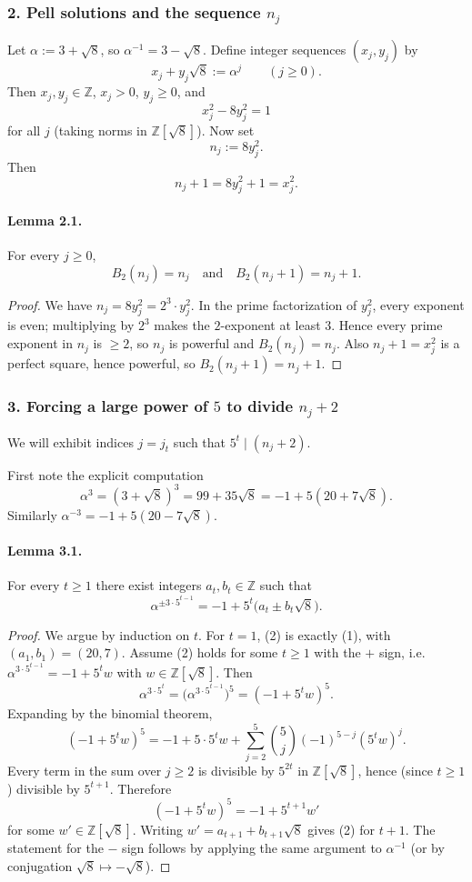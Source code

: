 \subsubsection*{2. Pell solutions and the sequence $n_j$}
Let $\alpha := 3+\sqrt{8}$, so $\alpha^{-1}=3-\sqrt{8}$.
Define integer sequences $(x_j,y_j)$ by
\[
 x_j + y_j\sqrt{8} := \alpha^j \qquad (j\ge 0).
\]
Then $x_j,y_j\in\mathbb{Z}$, $x_j>0$, $y_j\ge 0$, and
\[
 x_j^2 - 8y_j^2 = 1
\]
for all $j$ (taking norms in $\mathbb{Z}[\sqrt{8}]$).
Now set
\[
 n_j := 8y_j^2.
\]
Then
\[
 n_j+1 = 8y_j^2+1 = x_j^2.
\]

\paragraph{Lemma 2.1.} For every $j\ge 0$,
\[
B_2(n_j)=n_j\quad\text{and}\quad B_2(n_j+1)=n_j+1.
\]
\begin{proof}
We have $n_j=8y_j^2=2^3\cdot y_j^2$. In the prime factorization of $y_j^2$, every exponent is even; multiplying by $2^3$ makes the $2$-exponent at least $3$. Hence every prime exponent in $n_j$ is $\ge 2$, so $n_j$ is powerful and $B_2(n_j)=n_j$.
Also $n_j+1=x_j^2$ is a perfect square, hence powerful, so $B_2(n_j+1)=n_j+1$.
\end{proof}

\subsubsection*{3. Forcing a large power of $5$ to divide $n_j+2$}
We will exhibit indices $j=j_t$ such that $5^t\mid (n_{j}+2)$.

First note the explicit computation
\[
\alpha^3 = (3+\sqrt{8})^3 = 99 + 35\sqrt{8} = -1 + 5(20+7\sqrt{8}).
\tag{1}
\]
Similarly $\alpha^{-3}=-1+5(20-7\sqrt{8})$.

\paragraph{Lemma 3.1.} For every $t\ge 1$ there exist integers $a_t,b_t\in\mathbb{Z}$ such that
\[
\alpha^{\pm 3\cdot 5^{t-1}} = -1 + 5^t\bigl(a_t \pm b_t\sqrt{8}\bigr).
\tag{2}
\]
\begin{proof}
We argue by induction on $t$.
For $t=1$, (2) is exactly (1), with $(a_1,b_1)=(20,7)$.
Assume (2) holds for some $t\ge 1$ with the $+$ sign, i.e.
$\alpha^{3\cdot 5^{t-1}}=-1+5^t w$ with $w\in\mathbb{Z}[\sqrt{8}]$.
Then
\[
\alpha^{3\cdot 5^{t}} = \bigl(\alpha^{3\cdot 5^{t-1}}\bigr)^5 = (-1+5^t w)^5.
\]
Expanding by the binomial theorem,
\[
(-1+5^t w)^5 = -1 + 5\cdot 5^t w + \sum_{j=2}^5 \binom{5}{j} (-1)^{5-j} (5^t w)^j.
\]
Every term in the sum over $j\ge 2$ is divisible by $5^{2t}$ in $\mathbb{Z}[\sqrt{8}]$, hence (since $t\ge 1$) divisible by $5^{t+1}$. Therefore
\[
(-1+5^t w)^5 = -1 + 5^{t+1} w'
\]
for some $w'\in\mathbb{Z}[\sqrt{8}]$. Writing $w'=a_{t+1}+b_{t+1}\sqrt{8}$ gives (2) for $t+1$.
The statement for the $-$ sign follows by applying the same argument to $\alpha^{-1}$ (or by conjugation $\sqrt{8}\mapsto -\sqrt{8}$).
\end{proof}

